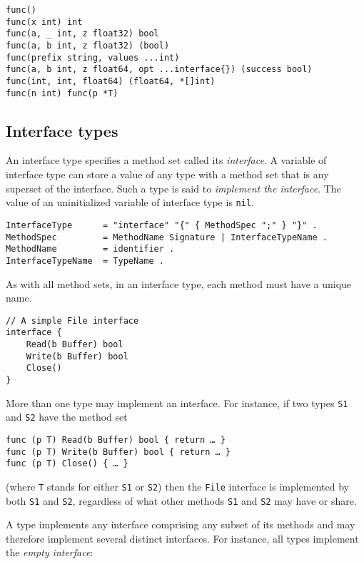 \begin{Verbatim}[frame=single]
func()
func(x int) int
func(a, _ int, z float32) bool
func(a, b int, z float32) (bool)
func(prefix string, values ...int)
func(a, b int, z float64, opt ...interface{}) (success bool)
func(int, int, float64) (float64, *[]int)
func(n int) func(p *T)
\end{Verbatim}

\subsection*{Interface types}

An interface type specifies a method set called
its \emph{interface}. A variable of interface type can store a value of
any type with a method set that is any superset of the interface. Such a
type is said to \emph{implement the interface}. The value of an
uninitialized variable of interface type is \texttt{nil}.

\begin{Verbatim}[frame=single]
InterfaceType      = "interface" "{" { MethodSpec ";" } "}" .
MethodSpec         = MethodName Signature | InterfaceTypeName .
MethodName         = identifier .
InterfaceTypeName  = TypeName .
\end{Verbatim}

As with all method sets, in an interface type, each method must have a
unique name.

\begin{Verbatim}[frame=single]
// A simple File interface
interface {
    Read(b Buffer) bool
    Write(b Buffer) bool
    Close()
}
\end{Verbatim}

More than one type may implement an interface. For instance, if two
types \texttt{S1} and \texttt{S2} have the method set

\begin{Verbatim}[frame=single]
func (p T) Read(b Buffer) bool { return … }
func (p T) Write(b Buffer) bool { return … }
func (p T) Close() { … }
\end{Verbatim}

(where \texttt{T} stands for either \texttt{S1} or \texttt{S2}) then the
\texttt{File} interface is implemented by both \texttt{S1} and
\texttt{S2}, regardless of what other methods \texttt{S1} and
\texttt{S2} may have or share.

A type implements any interface comprising any subset of its methods and
may therefore implement several distinct interfaces. For instance, all
types implement the \emph{empty interface}:


